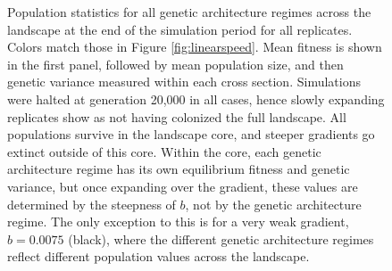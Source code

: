 \renewcommand{\thefigure}{B\arabic{figure}}
\setcounter{figure}{0}




\begin{figure}[h]
\centering
{}
\caption[~- Population statistics across the landscape.]{Population statistics for all genetic architecture regimes across the landscape at the end of the simulation period for all replicates. Colors match those in Figure \ref{fig:linearspeed}. Mean fitness is shown in the first panel, followed by mean population size, and then genetic variance measured within each cross section. Simulations were halted at generation 20,000 in all cases, hence slowly expanding replicates show as not having colonized the full landscape. All populations survive in the landscape core, and steeper gradients go extinct outside of this core. Within the core, each genetic architecture regime has its own equilibrium fitness and genetic variance, but once expanding over the gradient, these values are determined by the steepness of $b$, not by the genetic architecture regime. The only exception to this is for a very weak gradient, $b = 0.0075$ (black), where the different genetic architecture regimes reflect different population values across the landscape.}
\label{fig:fitness_popsize}
\end{figure}


